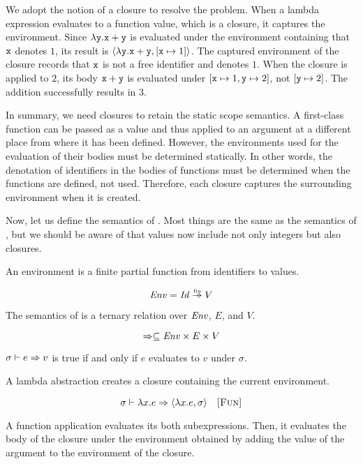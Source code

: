 We adopt the notion of a closure to resolve the problem. When a lambda
expression evaluates to a function value, which is a closure, it captures the
environment. Since $\lambda\texttt{y}.\texttt{x}+\texttt{y}$ is evaluated under the
environment containing that $\texttt{x}$ denotes $1$, its result is
$\langle\lambda\texttt{y}.\texttt{x}+\texttt{y},[\texttt{x}\mapsto1]\rangle$. The captured environment of the
closure records that $\texttt{x}$ is not a free identifier and denotes $1$.
When the closure is applied to $2$, its body ${\texttt{x}+\texttt{y}}$ is evaluated
under $[\texttt{x}\mapsto1,\texttt{y}\mapsto2]$, not $[\texttt{y}\mapsto2]$. The addition
successfully results in $3$.

In summary, we need closures to retain the static scope semantics. A first-class
function can be passed as a value and thus applied to an argument at a different
place from where it has been defined. However, the environments used for the
evaluation of their bodies must be determined statically. In other words,
the denotation of identifiers in the bodies of functions must be determined when
the functions are defined, not used. Therefore, each closure captures the surrounding
environment when it is created.

Now, let us define the semantics of \lang. Most things are the same as the
semantics of \plang, but we should be aware of that values now include not only
integers but also closures.

An environment is a finite partial function from identifiers to values.

\[ \embox{Env}=\embox{Id}\finto V \]

The semantics of \lang is a ternary relation over $\mbox{\emph{Env}}$, $E$, and $V$.

\[\Rightarrow\subseteq\mbox{\emph{Env}}\times E\times V\]

$\sigma\vdash e\Rightarrow v$ is true if and only if $e$ evaluates to $v$ under $\sigma$.

A lambda abstraction creates a closure containing the current environment.


\vspace{-1em}

\[
  \sigma\vdash\lambda x.e\Rightarrow\langle\lambda x.e,\sigma\rangle
  \quad\textsc{[Fun]}
\]

A function application evaluates its both subexpressions. Then, it evaluates the
body of the closure under the environment obtained by adding the value of the
argument to the environment of the closure.

